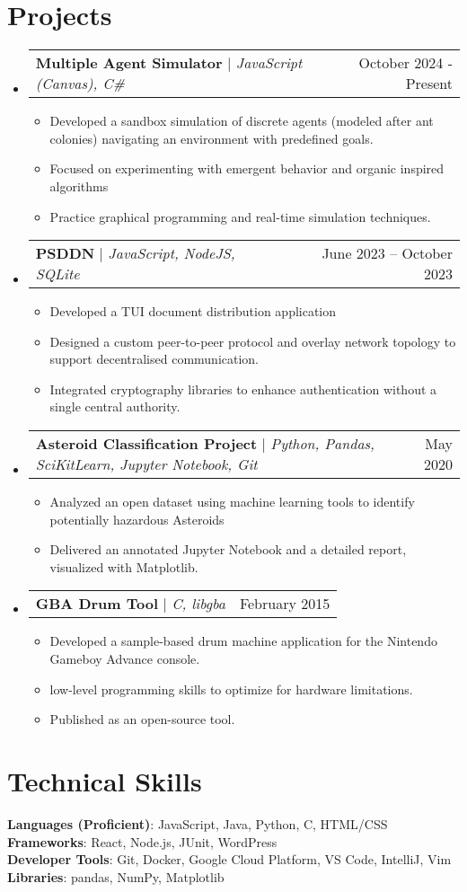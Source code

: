 \documentclass[letterpaper,11pt]{article}
\makeatletter
\newcommand{\resumeItem}[1]{
  \item\small{
    {#1 \vspace{-2pt}}
  }
}
\newcommand{\resumeProjectHeading}[2]{
    \item
    \begin{tabular*}{0.97\textwidth}{l@{\extracolsep{\fill}}r}
      \small#1 & #2 \\
    \end{tabular*}\vspace{-7pt}
}
\newcommand{\resumeSubHeadingListStart}{\begin{itemize}[leftmargin=0.15in, label={}]}
\newcommand{\resumeSubHeadingListEnd}{\end{itemize}}
\newcommand{\resumeItemListStart}{\begin{itemize}}
\newcommand{\resumeItemListEnd}{\end{itemize}\vspace{-5pt}}
\makeatother
\begin{document}
\section{Projects}
    \resumeSubHeadingListStart
           \resumeProjectHeading
          {\textbf{Multiple Agent Simulator} $|$ \emph{JavaScript (Canvas), C\# }}{ October 2024 - Present}
          \resumeItemListStart
            \resumeItem{Developed a sandbox simulation of discrete agents (modeled after ant colonies) navigating an environment with predefined goals.}
            \resumeItem{Focused on experimenting with emergent behavior and organic inspired algorithms}
            \resumeItem{Practice graphical programming and real-time simulation techniques.}
          \resumeItemListEnd
      \resumeProjectHeading
          {\textbf{PSDDN} $|$ \emph{JavaScript, NodeJS, SQLite}}{June 2023 -- October 2023}
          \resumeItemListStart
            \resumeItem{Developed a TUI document distribution application}
            \resumeItem{Designed a custom peer-to-peer protocol and overlay network topology to support decentralised communication.}
            \resumeItem{Integrated cryptography libraries to enhance authentication without a single central authority.}
          \resumeItemListEnd
      \resumeProjectHeading
          {\textbf{Asteroid Classification Project} $|$ \emph{Python, Pandas, SciKitLearn, Jupyter Notebook, Git}}{ May 2020}
          \resumeItemListStart
            \resumeItem{Analyzed an open dataset using machine learning tools to identify potentially hazardous Asteroids}
            \resumeItem{Delivered an annotated Jupyter Notebook and a detailed report, visualized with Matplotlib.}
          \resumeItemListEnd
        \resumeProjectHeading
          {\textbf{GBA Drum Tool} $|$ \emph{C, libgba}}{ February 2015}
          \resumeItemListStart
            \resumeItem{Developed a sample-based drum machine application for the Nintendo Gameboy Advance console.}
            \resumeItem{ low-level programming skills to optimize for hardware limitations.}
            \resumeItem{Published as an open-source tool.}
          \resumeItemListEnd
 
          
    \resumeSubHeadingListEnd



%
\section{Technical Skills}
 \begin{itemize}[leftmargin=0.15in, label={}]
    \small{\item{
     \textbf{Languages (Proficient)}{: JavaScript, Java, Python, C, HTML/CSS} \\
     \textbf{Frameworks}{: React, Node.js, JUnit, WordPress} \\
     \textbf{Developer Tools}{: Git, Docker, Google Cloud Platform, VS Code, IntelliJ, Vim} \\
     \textbf{Libraries}{: pandas, NumPy, Matplotlib}
    }}
 \end{itemize}


\end{document}

